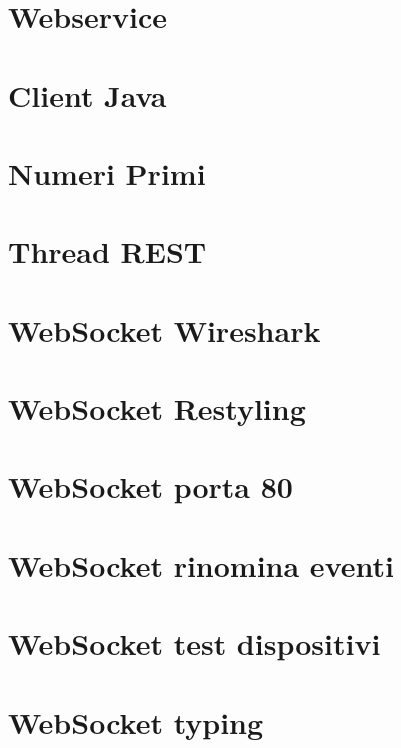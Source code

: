 \documentclass[11pt]{article}
\begin{document}
\section{Webservice}

\newpage

\section{Client Java}

\newpage

\section{Numeri Primi}

\newpage

\section{Thread REST}

\newpage

\section{WebSocket Wireshark}

\newpage

\section{WebSocket Restyling}

\newpage

\section{WebSocket porta 80}

\newpage

\section{WebSocket rinomina eventi}

\newpage

\section{WebSocket test dispositivi}

\newpage

\section{WebSocket typing}

\newpage
\end{document}
